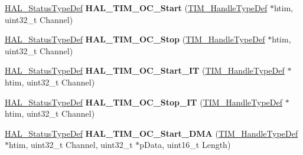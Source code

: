 \begin{DoxyCompactItemize}
\item 
\hypertarget{group___t_i_m___exported___functions___group2_ga5dbbafc75b341b79d29bc41f8ec15492}{\hyperlink{stm32l1xx__hal__def_8h_a63c0679d1cb8b8c684fbb0632743478f}{H\-A\-L\-\_\-\-Status\-Type\-Def} {\bfseries H\-A\-L\-\_\-\-T\-I\-M\-\_\-\-O\-C\-\_\-\-Start} (\hyperlink{struct_t_i_m___handle_type_def}{T\-I\-M\-\_\-\-Handle\-Type\-Def} $\ast$htim, uint32\-\_\-t Channel)}\label{group___t_i_m___exported___functions___group2_ga5dbbafc75b341b79d29bc41f8ec15492}

\item 
\hypertarget{group___t_i_m___exported___functions___group2_ga9cb1f62afb99aea0db8cc28b378b68ad}{\hyperlink{stm32l1xx__hal__def_8h_a63c0679d1cb8b8c684fbb0632743478f}{H\-A\-L\-\_\-\-Status\-Type\-Def} {\bfseries H\-A\-L\-\_\-\-T\-I\-M\-\_\-\-O\-C\-\_\-\-Stop} (\hyperlink{struct_t_i_m___handle_type_def}{T\-I\-M\-\_\-\-Handle\-Type\-Def} $\ast$htim, uint32\-\_\-t Channel)}\label{group___t_i_m___exported___functions___group2_ga9cb1f62afb99aea0db8cc28b378b68ad}

\item 
\hypertarget{group___t_i_m___exported___functions___group2_gad3116f3b344392f7b947ff1218ba9ed8}{\hyperlink{stm32l1xx__hal__def_8h_a63c0679d1cb8b8c684fbb0632743478f}{H\-A\-L\-\_\-\-Status\-Type\-Def} {\bfseries H\-A\-L\-\_\-\-T\-I\-M\-\_\-\-O\-C\-\_\-\-Start\-\_\-\-I\-T} (\hyperlink{struct_t_i_m___handle_type_def}{T\-I\-M\-\_\-\-Handle\-Type\-Def} $\ast$htim, uint32\-\_\-t Channel)}\label{group___t_i_m___exported___functions___group2_gad3116f3b344392f7b947ff1218ba9ed8}

\item 
\hypertarget{group___t_i_m___exported___functions___group2_gacc324ef35c0b207a8331c657d86fc1bd}{\hyperlink{stm32l1xx__hal__def_8h_a63c0679d1cb8b8c684fbb0632743478f}{H\-A\-L\-\_\-\-Status\-Type\-Def} {\bfseries H\-A\-L\-\_\-\-T\-I\-M\-\_\-\-O\-C\-\_\-\-Stop\-\_\-\-I\-T} (\hyperlink{struct_t_i_m___handle_type_def}{T\-I\-M\-\_\-\-Handle\-Type\-Def} $\ast$htim, uint32\-\_\-t Channel)}\label{group___t_i_m___exported___functions___group2_gacc324ef35c0b207a8331c657d86fc1bd}

\item 
\hypertarget{group___t_i_m___exported___functions___group2_ga6f961349029a84317b7734abbfb9a02c}{\hyperlink{stm32l1xx__hal__def_8h_a63c0679d1cb8b8c684fbb0632743478f}{H\-A\-L\-\_\-\-Status\-Type\-Def} {\bfseries H\-A\-L\-\_\-\-T\-I\-M\-\_\-\-O\-C\-\_\-\-Start\-\_\-\-D\-M\-A} (\hyperlink{struct_t_i_m___handle_type_def}{T\-I\-M\-\_\-\-Handle\-Type\-Def} $\ast$htim, uint32\-\_\-t Channel, uint32\-\_\-t $\ast$p\-Data, uint16\-\_\-t Length)}\label{group___t_i_m___exported___functions___group2_ga6f961349029a84317b7734abbfb9a02c}


\end{DoxyCompactItemize}
